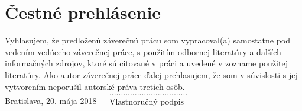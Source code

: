 \null
\vfill
\noindent
\section*{Čestné prehlásenie}

Vyhlasujem, že predloženú záverečnú prácu som vypracoval(a) samostatne pod vedením vedúceho záverečnej práce, s použitím odbornej literatúry a ďalších informačných zdrojov, ktoré sú citované v práci a uvedené v zozname použitej literatúry. Ako autor záverečnej práce ďalej prehlasujem, že som v súvislosti s jej vytvorením neporušil autorské práva tretích osôb.\\

\noindent Bratislava, 20. mája 2018 \hfill $\begin{array}{rl}
	&\text{..................................}\\
	&\text{Vlastnoručný podpis}\\
\end{array}$
\cleardoublepage
